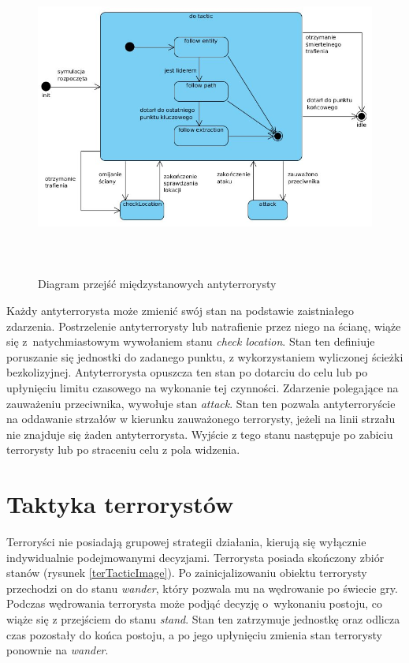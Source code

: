 \begin{figure}
\begin{center}
	\includegraphics[width=160mm,height=105mm]{images/atTactic}
	\caption{Diagram przejść międzystanowych antyterrorysty\label{atTacticImage}}
\end{center}
\end{figure}

Każdy antyterrorysta może zmienić swój stan na podstawie zaistniałego zdarzenia. Postrzelenie antyterrorysty lub natrafienie przez niego na ścianę, wiąże się z~natychmiastowym wywołaniem stanu \emph{check location}. Stan ten definiuje poruszanie się jednostki do zadanego punktu, z wykorzystaniem wyliczonej ścieżki bezkolizyjnej. Antyterrorysta opuszcza ten stan po dotarciu do celu lub po upłynięciu limitu czasowego na wykonanie tej czynności. Zdarzenie polegające na zauważeniu przeciwnika, wywołuje stan \emph{attack}. Stan ten pozwala antyterroryście na oddawanie strzałów w kierunku zauważonego terrorysty, jeżeli na linii strzału nie znajduje się żaden antyterrorysta. Wyjście z tego stanu następuje po zabiciu terrorysty lub po straceniu celu z pola widzenia.

\section{Taktyka terrorystów}
Terroryści nie posiadają grupowej strategii działania, kierują się wyłącznie indywidualnie podejmowanymi decyzjami. Terrorysta posiada skończony zbiór stanów (rysunek \ref{terTacticImage}). Po zainicjalizowaniu obiektu terrorysty przechodzi on do stanu \emph{wander}, który pozwala mu na wędrowanie po świecie gry. Podczas wędrowania terrorysta może podjąć decyzję o~wykonaniu postoju, co wiąże się z przejściem do stanu \emph{stand}. Stan ten zatrzymuje jednostkę oraz odlicza czas pozostały do końca postoju, a po jego upłynięciu zmienia stan terrorysty ponownie na \emph{wander}.

